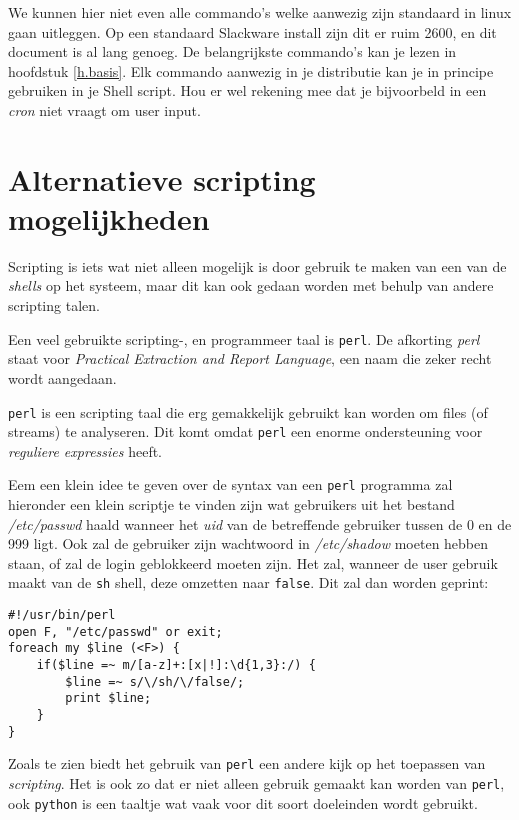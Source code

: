 We kunnen hier niet even alle commando's welke aanwezig zijn standaard in linux gaan uitleggen. Op een standaard Slackware install zijn dit er ruim 2600, en dit document is al lang genoeg. De belangrijkste commando's kan je lezen in hoofdstuk \ref{h.basis}. Elk commando aanwezig in je distributie kan je in principe gebruiken in je Shell script. Hou er wel rekening mee dat je bijvoorbeld in een \emph{cron} niet vraagt om user input. 

\section{Alternatieve scripting mogelijkheden}
Scripting is iets wat niet alleen mogelijk is door gebruik te maken van een van de \emph{shells} op het systeem, maar dit kan ook gedaan worden met behulp van andere scripting talen. 

Een veel gebruikte scripting-, en programmeer taal is \texttt{perl}\cite{bib.perl.wiki}\cite{bib.perl.doc}. De afkorting \emph{perl} staat voor \emph{Practical Extraction and Report Language}, een naam die zeker recht wordt aangedaan. 

\texttt{perl} is een scripting taal die erg gemakkelijk gebruikt kan worden om files (of streams) te analyseren. Dit komt omdat \texttt{perl} een enorme ondersteuning voor \emph{reguliere expressies} heeft. 

Eem een klein idee te geven over de syntax van een \texttt{perl} programma zal hieronder een klein scriptje te vinden zijn wat gebruikers uit het bestand \emph{/etc/passwd} haald wanneer het \emph{uid} van de betreffende gebruiker tussen de 0 en de 999 ligt. Ook zal de gebruiker zijn wachtwoord in \emph{/etc/shadow} moeten hebben staan, of zal de login geblokkeerd moeten zijn. Het zal, wanneer de user gebruik maakt van de \texttt{sh} shell, deze omzetten naar \texttt{false}. Dit zal dan worden geprint:
\begin{lstlisting}
#!/usr/bin/perl
open F, "/etc/passwd" or exit;
foreach my $line (<F>) {
    if($line =~ m/[a-z]+:[x|!]:\d{1,3}:/) {
        $line =~ s/\/sh/\/false/;
        print $line;
    }
}
\end{lstlisting}
Zoals te zien biedt het gebruik van \texttt{perl} een andere kijk op het toepassen van \emph{scripting}. Het is ook zo dat er niet alleen gebruik gemaakt kan worden van \texttt{perl}, ook \texttt{python} is een taaltje wat vaak voor dit soort doeleinden wordt gebruikt. 

